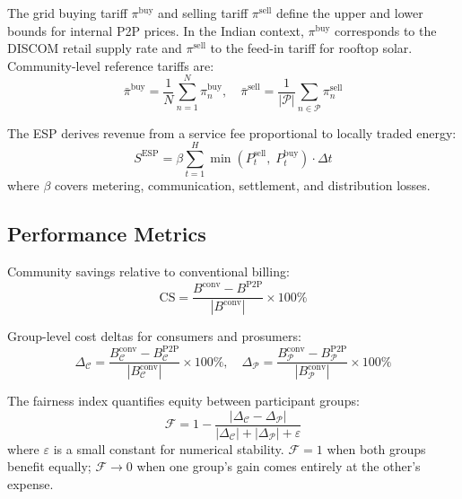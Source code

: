 \documentclass[pdflatex,sn-mathphys-num]{sn-jnl}
\theoremstyle{thmstyleone}
\theoremstyle{thmstyletwo}
\begin{document}
The grid buying tariff $\pi^{\text{buy}}$ and selling tariff $\pi^{\text{sell}}$ define the upper and lower bounds for internal P2P prices. In the Indian context, $\pi^{\text{buy}}$ corresponds to the DISCOM retail supply rate and $\pi^{\text{sell}}$ to the feed-in tariff for rooftop solar. Community-level reference tariffs are:
\begin{equation}
    \bar{\pi}^{\text{buy}} = \frac{1}{N}\sum_{n=1}^{N}\pi_n^{\text{buy}}, \quad \bar{\pi}^{\text{sell}} = \frac{1}{|\mathcal{P}|}\sum_{n \in \mathcal{P}}\pi_n^{\text{sell}}
    \label{eq:ref_tariffs}
\end{equation}

The ESP derives revenue from a service fee proportional to locally traded energy:
\begin{equation}
    S^{\text{ESP}} = \beta \sum_{t=1}^{H} \min(P_t^{\text{sell}},\; P_t^{\text{buy}}) \cdot \Delta t
    \label{eq:esp_revenue}
\end{equation}
where $\beta$ covers metering, communication, settlement, and distribution losses.

\subsection{Performance Metrics}

Community savings relative to conventional billing:
\begin{equation}
    \text{CS} = \frac{B^{\text{conv}} - B^{\text{P2P}}}{|B^{\text{conv}}|} \times 100\%
    \label{eq:community_savings}
\end{equation}

Group-level cost deltas for consumers and prosumers:
\begin{equation}
    \Delta_{\mathcal{C}} = \frac{B_{\mathcal{C}}^{\text{conv}} - B_{\mathcal{C}}^{\text{P2P}}}{|B_{\mathcal{C}}^{\text{conv}}|} \times 100\%, \quad \Delta_{\mathcal{P}} = \frac{B_{\mathcal{P}}^{\text{conv}} - B_{\mathcal{P}}^{\text{P2P}}}{|B_{\mathcal{P}}^{\text{conv}}|} \times 100\%
    \label{eq:group_deltas}
\end{equation}

The fairness index quantifies equity between participant groups:
\begin{equation}
    \mathcal{F} = 1 - \frac{|\Delta_{\mathcal{C}} - \Delta_{\mathcal{P}}|}{|\Delta_{\mathcal{C}}| + |\Delta_{\mathcal{P}}| + \varepsilon}
    \label{eq:fairness}
\end{equation}
where $\varepsilon$ is a small constant for numerical stability. $\mathcal{F} = 1$ when both groups benefit equally; $\mathcal{F} \to 0$ when one group's gain comes entirely at the other's expense.
\end{document}
